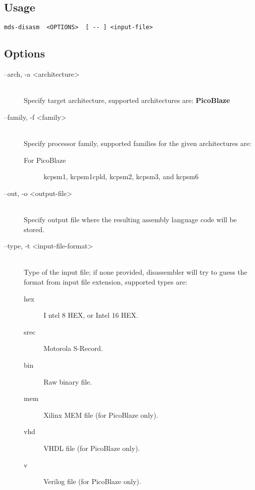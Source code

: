     \subsection{Usage}
        \verb'mds-disasm  <OPTIONS>  [ -- ] <input-file>'

    \subsection{Options}
        \begin{description}
            \item[--arch, -a <architecture>]~\\
                Specify target architecture, supported architectures are: \textbf{PicoBlaze}

            \item[--family, -f <family>]~\\
                Specify processor family, supported families for the given architectures are:
                \begin{description}
                    \item[For PicoBlaze]
                        kcpsm1, kcpsm1cpld, kcpsm2, kcpsm3, and kcpsm6
                \end{description}

            \item[--out, -o <output-file>]~\\
                Specify output file where the resulting assembly language code will be stored.

            \item[--type, -t <input-file-format>]~\\
                Type of the input file; if none provided, disassembler will try to guess the format from input file extension, supported types are:
                \begin{description}
                    \item [hex]I ntel 8 HEX, or Intel 16 HEX.
                    \item [srec] Motorola S-Record.
                    \item [bin] Raw binary file.
                    \item [mem] Xilinx MEM file (for PicoBlaze only).
                    \item [vhd] VHDL file (for PicoBlaze only).
                    \item [v] Verilog file (for PicoBlaze only).
                \end{description}


\end{description}
